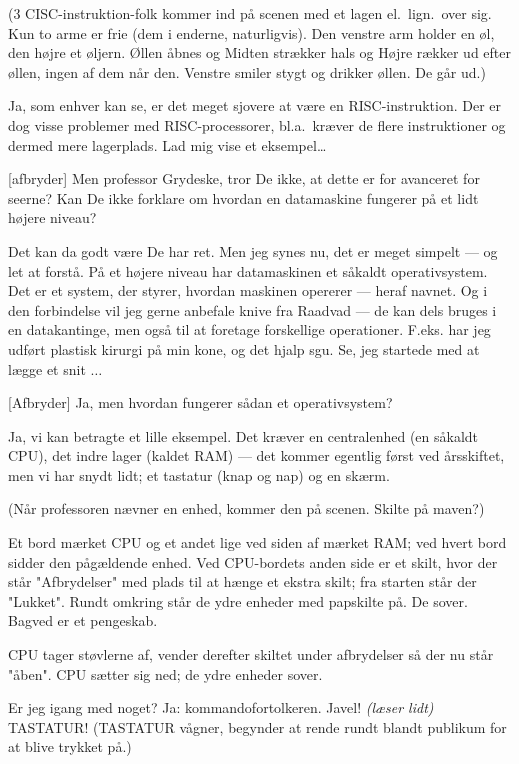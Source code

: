 \documentclass{article}
\begin{document}
\begin{sketch}
\scene (3 CISC-instruktion-folk kommer ind på scenen med et lagen el.\
lign.\  over sig. Kun to arme er frie (dem i enderne, naturligvis).
Den venstre arm holder en øl, den højre et øljern. Øllen åbnes og
Midten strækker hals og Højre rækker ud efter øllen, ingen af dem når
den.  Venstre smiler stygt og drikker øllen. De går ud.)

 Ja, som enhver kan se, er det meget sjovere at være
en RISC-instruktion.  Der er dog visse problemer med
RISC-processorer, bl.a.\ kræver de flere instruktioner og dermed mere
lagerplads. Lad mig vise et eksempel\ldots

[afbryder] Men professor Grydeske, tror De ikke,
at dette er for avanceret for seerne? Kan De ikke forklare om
hvordan en datamaskine fungerer på et lidt højere niveau?

 Det kan da godt være De har ret. Men jeg synes nu,
det er meget simpelt --- og let at forstå. På et højere niveau har
datamaskinen et såkaldt operativsystem. Det er et system, der styrer,
hvordan maskinen opererer --- heraf navnet. Og i den forbindelse vil
jeg gerne anbefale knive fra Raadvad --- de kan dels bruges i en
datakantinge, men også til at foretage forskellige operationer.
F.eks. har jeg udført plastisk kirurgi på min kone, og det hjalp
sgu. Se, jeg startede med at lægge et snit $\ldots$

[Afbryder] Ja, men hvordan fungerer sådan et
operativsystem? 

 Ja, vi kan betragte et lille eksempel. Det kræver en
centralenhed (en såkaldt CPU), det indre lager (kaldet RAM) --- det
kommer egentlig først ved årsskiftet, men vi har snydt lidt; et
tastatur (knap og nap) og en skærm.

\scene
(Når professoren nævner en enhed, kommer den på scenen. Skilte
på maven?)

Et bord mærket CPU og et andet lige ved siden af mærket RAM;
ved hvert bord sidder den pågældende enhed. Ved CPU-bordets
anden side er et skilt, hvor der står "Afbrydelser" med plads
til at hænge et ekstra skilt; fra starten står der "Lukket".
Rundt omkring står de ydre enheder med papskilte på. De
sover. Bagved er et pengeskab.

CPU tager støvlerne af, vender derefter skiltet under afbrydelser så
der nu står "åben". CPU sætter sig ned; de ydre enheder sover.


 Er jeg igang med noget?
 Ja: kommandofortolkeren.
\says{CPU} Javel! {\em (læser lidt)} TASTATUR!
\scene 
(TASTATUR vågner, begynder at rende rundt blandt publikum for at
blive trykket på.)


\end{sketch}
\end{document}
